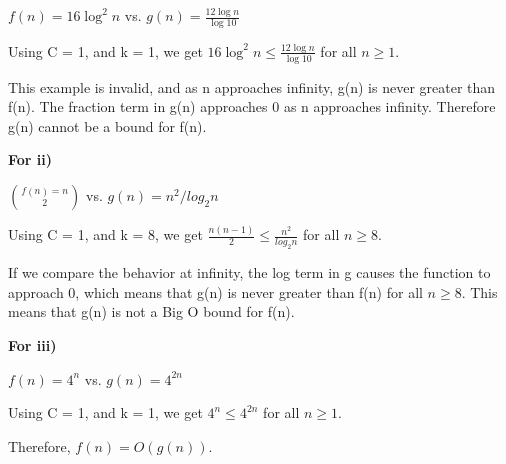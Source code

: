 \documentclass[11pt,largemargins]{homework}
\begin{document}
\begin{alphaparts}
  $f(n) = 16 \log^2 n$ vs. $g(n) = \frac{12 \log n}{\log 10}$

  Using C = 1, and k = 1, we get $16 \log^2 n \leq \frac{12 \log n}{\log 10}$ for all $n \geq 1$.

  This example is invalid, and as n approaches infinity, g(n) is never greater than f(n). 
  The fraction term in g(n) approaches 0 as n approaches infinity.
  Therefore g(n) cannot be a bound for f(n).


  \textbf{For ii)}

  $f(n) = n \choose 2$ vs. $g(n) = n^2 / log_2 n$

  Using C = 1, and k = 8, we get $\frac{n(n-1)}{2} \leq \frac{n^2}{log_2 n}$ for all $n \geq 8$.

  If we compare the behavior at infinity, the log term in g causes the function to approach 0, 
  which means that g(n) is never greater than f(n) for all $n \geq 8$.
  This means that g(n) is not a Big O bound for f(n).




  



  \textbf{For iii)}

  $f(n) = 4^n$ vs. $g(n) = 4^{2n}$

  Using C = 1, and k = 1, we get $4^n \leq 4^{2n}$ for all $n \geq 1$.

  Therefore, $f(n) = O(g(n))$.

\end{alphaparts}




\newpage
\question
\end{document}
